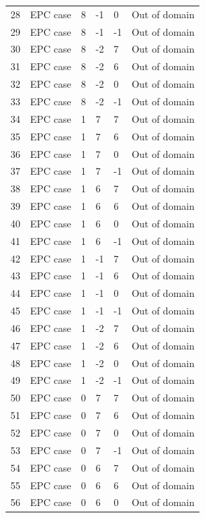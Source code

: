 \documentclass[12pt, letterpaper, titlepage]{article}
\begin{document}
\begin{tabularx}{\textwidth}{|X|X|a|a|a|X|}
    28 & EPC case & 8 & -1 & 0 & Out of domain \\
    29 & EPC case & 8 & -1 & -1 & Out of domain \\
    30 & EPC case & 8 & -2 & 7 & Out of domain \\
    31 & EPC case & 8 & -2 & 6 & Out of domain \\
    32 & EPC case & 8 & -2 & 0 & Out of domain \\
    33 & EPC case & 8 & -2 & -1 & Out of domain \\
    34 & EPC case & 1 & 7 & 7 & Out of domain \\
    35 & EPC case & 1 & 7 & 6 & Out of domain \\
    36 & EPC case & 1 & 7 & 0 & Out of domain \\
    37 & EPC case & 1 & 7 & -1 & Out of domain \\
    38 & EPC case & 1 & 6 & 7 & Out of domain \\
    39 & EPC case & 1 & 6 & 6 & Out of domain \\
    40 & EPC case & 1 & 6 & 0 & Out of domain \\
    41 & EPC case & 1 & 6 & -1 & Out of domain \\
    42 & EPC case & 1 & -1 & 7 & Out of domain \\
    43 & EPC case & 1 & -1 & 6 & Out of domain \\
    44 & EPC case & 1 & -1 & 0 & Out of domain \\
    45 & EPC case & 1 & -1 & -1 & Out of domain \\
    46 & EPC case & 1 & -2 & 7 & Out of domain \\
    47 & EPC case & 1 & -2 & 6 & Out of domain \\
    48 & EPC case & 1 & -2 & 0 & Out of domain \\
    49 & EPC case & 1 & -2 & -1 & Out of domain \\
    50 & EPC case & 0 & 7 & 7 & Out of domain \\
    51 & EPC case & 0 & 7 & 6 & Out of domain \\
    52 & EPC case & 0 & 7 & 0 & Out of domain \\
    53 & EPC case & 0 & 7 & -1 & Out of domain \\
    54 & EPC case & 0 & 6 & 7 & Out of domain \\
    55 & EPC case & 0 & 6 & 6 & Out of domain \\
    56 & EPC case & 0 & 6 & 0 & Out of domain \\

\end{tabularx}
\end{document}

